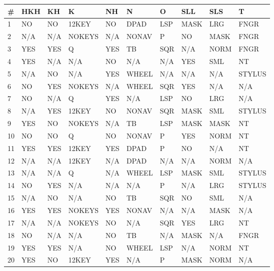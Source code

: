 \documentclass[12pt, letterpaper, titlepage]{article}
\begin{document}
\scriptsize
\begin{tabularx}{\textwidth}{|X|X|X|X|X|X|X|X|X|X|}
    \caption{Results using pairwise testing} \\ \hline
    \textbf{\#} & \textbf{HKH} & \textbf{KH} & \textbf{K} & \textbf{NH} & \textbf{N} & \textbf{O} & \textbf{SLL} & \textbf{SLS} & \textbf{T} \\ \hline
    1 & NO & NO & 12KEY & NO & DPAD & LSP & MASK & LRG & FNGR \\ \hline
    2 & N/A & N/A & NOKEYS & N/A & NONAV & P & NO & MASK & FNGR \\ \hline
    3 & YES & YES & Q & YES & TB & SQR & N/A & NORM & FNGR \\ \hline
    4 & YES & N/A & N/A & NO & N/A & N/A & YES & SML & NT \\ \hline
    5 & N/A & NO & N/A & YES & WHEEL & N/A & N/A & N/A & STYLUS \\ \hline
    6 & NO & YES & NOKEYS & N/A & WHEEL & SQR & YES & N/A & N/A \\ \hline
    7 & NO & N/A & Q & YES & N/A & LSP & NO & LRG & N/A \\ \hline
    8 & N/A & YES & 12KEY & NO & NONAV & SQR & MASK & SML & STYLUS \\ \hline
    9 & YES & NO & NOKEYS & N/A & TB & LSP & MASK & MASK & NT \\ \hline
    10 & NO & NO & Q & NO & NONAV & P & YES & NORM & NT \\ \hline
    11 & YES & YES & 12KEY & YES & DPAD & P & NO & N/A & NT \\ \hline
    12 & N/A & N/A & 12KEY & N/A & DPAD & N/A & N/A & NORM & N/A \\ \hline
    13 & N/A & N/A & Q & N/A & WHEEL & LSP & MASK & SML & STYLUS \\ \hline
    14 & NO & YES & N/A & N/A & N/A & P & N/A & LRG & STYLUS \\ \hline
    15 & N/A & NO & N/A & NO & TB & SQR & NO & SML & N/A \\ \hline
    16 & YES & YES & NOKEYS & YES & NONAV & N/A & N/A & MASK & N/A \\ \hline
    17 & N/A & N/A & NOKEYS & NO & N/A & SQR & YES & LRG & NT \\ \hline
    18 & NO & N/A & N/A & NO & TB & N/A & MASK & N/A & FNGR \\ \hline
    19 & YES & YES & N/A & NO & WHEEL & LSP & N/A & NORM & NT \\ \hline
    20 & YES & NO & 12KEY & YES & N/A & P & MASK & NORM & N/A \\ \hline

\end{tabularx}
\end{document}
